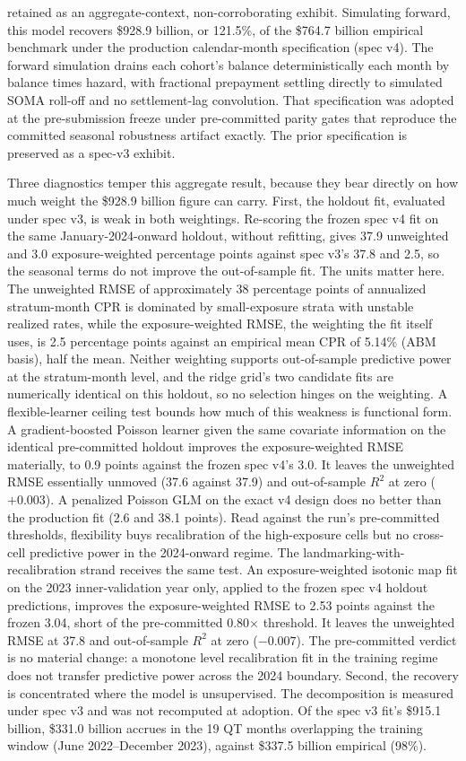 \documentclass[12pt]{article}
\begin{document}
retained as an aggregate-context, non-corroborating exhibit. Simulating forward, this model recovers \$928.9 billion, or 121.5\%, of the \$764.7 billion empirical benchmark under the production calendar-month specification (spec v4). The forward simulation drains each cohort's balance deterministically each month by balance times hazard, with fractional prepayment settling directly to simulated SOMA roll-off and no settlement-lag convolution. That specification was adopted at the pre-submission freeze under pre-committed parity gates that reproduce the committed seasonal robustness artifact exactly. The prior specification is preserved as a spec-v3 exhibit.

Three diagnostics temper this aggregate result, because they bear directly on how much weight the \$928.9 billion figure can carry. First, the holdout fit, evaluated under spec v3, is weak in both weightings. Re-scoring the frozen spec v4 fit on the same January-2024-onward holdout, without refitting, gives 37.9 unweighted and 3.0 exposure-weighted percentage points against spec v3's 37.8 and 2.5, so the seasonal terms do not improve the out-of-sample fit. The units matter here. The unweighted RMSE of approximately 38 percentage points of annualized stratum-month CPR is dominated by small-exposure strata with unstable realized rates, while the exposure-weighted RMSE, the weighting the fit itself uses, is 2.5 percentage points against an empirical mean CPR of 5.14\% (ABM basis), half the mean. Neither weighting supports out-of-sample predictive power at the stratum-month level, and the ridge grid's two candidate fits are numerically identical on this holdout, so no selection hinges on the weighting. A flexible-learner ceiling test bounds how much of this weakness is functional form. A gradient-boosted Poisson learner given the same covariate information on the identical pre-committed holdout improves the exposure-weighted RMSE materially, to 0.9 points against the frozen spec v4's 3.0. It leaves the unweighted RMSE essentially unmoved (37.6 against 37.9) and out-of-sample $R^2$ at zero ($+0.003$). A penalized Poisson GLM on the exact v4 design does no better than the production fit (2.6 and 38.1 points). Read against the run's pre-committed thresholds, flexibility buys recalibration of the high-exposure cells but no cross-cell predictive power in the 2024-onward regime. The landmarking-with-recalibration strand receives the same test. An exposure-weighted isotonic map fit on the 2023 inner-validation year only, applied to the frozen spec v4 holdout predictions, improves the exposure-weighted RMSE to 2.53 points against the frozen 3.04, short of the pre-committed 0.80$\times$ threshold. It leaves the unweighted RMSE at 37.8 and out-of-sample $R^2$ at zero ($-0.007$). The pre-committed verdict is no material change: a monotone level recalibration fit in the training regime does not transfer predictive power across the 2024 boundary. Second, the recovery is concentrated where the model is unsupervised. The decomposition is measured under spec v3 and was not recomputed at adoption. Of the spec v3 fit's \$915.1 billion, \$331.0 billion accrues in the 19 QT months overlapping the training window (June 2022--December 2023), against \$337.5 billion empirical (98\%). 
\end{document}
